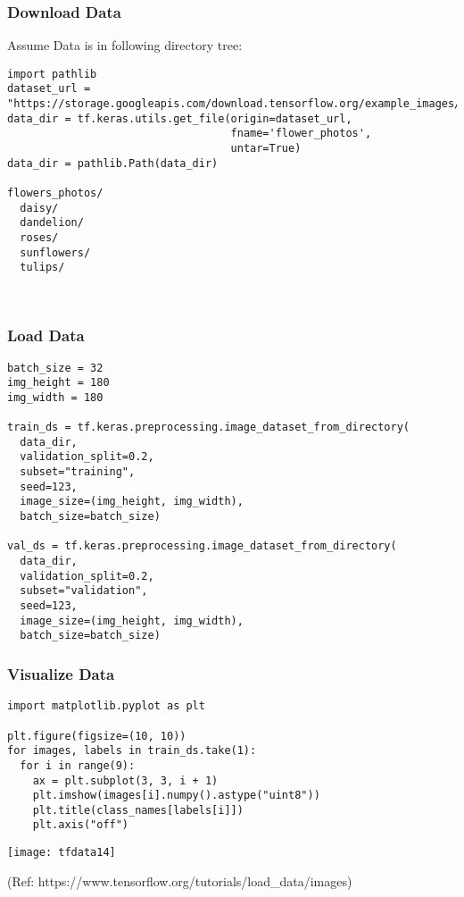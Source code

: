 \begin{frame}[fragile]\frametitle{Download Data}

Assume Data is in following directory tree:

\begin{lstlisting}
import pathlib
dataset_url = "https://storage.googleapis.com/download.tensorflow.org/example_images/flower_photos.tgz"
data_dir = tf.keras.utils.get_file(origin=dataset_url, 
                                   fname='flower_photos', 
                                   untar=True)
data_dir = pathlib.Path(data_dir)

flowers_photos/
  daisy/
  dandelion/
  roses/
  sunflowers/
  tulips/
	
	
\end{lstlisting}
\end{frame}


\begin{frame}[fragile]\frametitle{Load Data}

\begin{lstlisting}
batch_size = 32
img_height = 180
img_width = 180

train_ds = tf.keras.preprocessing.image_dataset_from_directory(
  data_dir,
  validation_split=0.2,
  subset="training",
  seed=123,
  image_size=(img_height, img_width),
  batch_size=batch_size)
	
val_ds = tf.keras.preprocessing.image_dataset_from_directory(
  data_dir,
  validation_split=0.2,
  subset="validation",
  seed=123,
  image_size=(img_height, img_width),
  batch_size=batch_size)
\end{lstlisting}
\end{frame}

\begin{frame}[fragile]\frametitle{Visualize Data}

\begin{lstlisting}
import matplotlib.pyplot as plt

plt.figure(figsize=(10, 10))
for images, labels in train_ds.take(1):
  for i in range(9):
    ax = plt.subplot(3, 3, i + 1)
    plt.imshow(images[i].numpy().astype("uint8"))
    plt.title(class_names[labels[i]])
    plt.axis("off")
\end{lstlisting}

\begin{center}
\texttt{[image: tfdata14]}
\end{center}

{\tiny (Ref: https://www.tensorflow.org/tutorials/load\_data/images)}

\end{frame}


